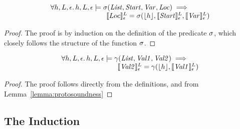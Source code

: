 \documentclass{article}
\begin{document}
\begin{lemma}
        \label{lemma:scopesoundness}
\[
\begin{array}{l}
\forall h,L,\epsilon \mathpunct{.} h,L,\epsilon\models \sigma({\mathit{List}},{\mathit{Start}},{\mathit{Var}},{\mathit{Loc}}) \implies \\
\qquad\qquad\qquad\qquad\llbracket Loc \rrbracket^L_{\epsilon} = \sigma(\lfloor h\rfloor,\llbracket {\ensuremath{\mathit{Start}}} \rrbracket^L_{\epsilon},\llbracket {\ensuremath{\mathit{Var}}} \rrbracket^L_{\epsilon})
\end{array}
\]
\begin{proof}
        The proof is by induction on the definition of the predicate $\sigma$, which closely follows the structure of the function $\sigma$.
\end{proof}
\end{lemma}



\begin{lemma}
        \label{lemma:gvsoundness}
        \[\begin{array}{l}
                \forall h,L,\epsilon \mathpunct{.} h,L,\epsilon\models \gamma({\mathit{List}},{\mathit{Val1}},{\mathit{Val2}}) \implies \\
                \qquad\qquad\qquad\qquad \llbracket {\ensuremath{\mathit{Val2}}} \rrbracket^L_\epsilon = \gamma(\lfloor h\rfloor,\llbracket {\ensuremath{\mathit{Val1}}} \rrbracket^L_\epsilon)
        \end{array}
        \]
        \begin{proof}
                The proof follows directly from the definitions, and from Lemma~\ref{lemma:protosoundness}
        \end{proof}
\end{lemma}



% 
% 
% 
% 

\subsection{The Induction}
\end{document}

